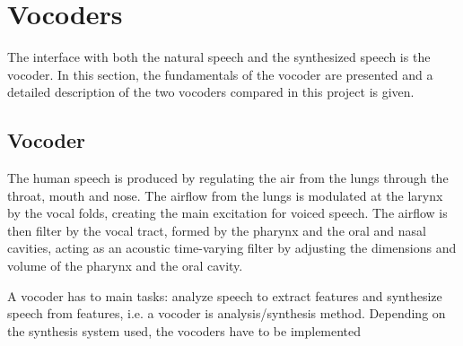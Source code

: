 \section{Vocoders}
\label{vocoders}
The interface with both the natural speech and the synthesized speech is the vocoder. In this section, the fundamentals of the vocoder are presented and a detailed description of the two vocoders compared in this project is given.

\subsection{Vocoder}
\label{vocoders_vocoder}
The human speech is produced by regulating the air from the lungs through the throat, mouth and nose. The airflow from the lungs is modulated at the larynx by the vocal folds, creating the main excitation for voiced speech. The airflow is then filter by the vocal tract, formed by the pharynx and the oral and nasal cavities, acting as an acoustic time-varying filter by adjusting the dimensions and volume of the pharynx and the oral cavity.

A vocoder has to main tasks: analyze speech to extract features and synthesize speech from features, i.e. a vocoder is analysis/synthesis method. Depending on the synthesis system used, the vocoders have to be implemented 